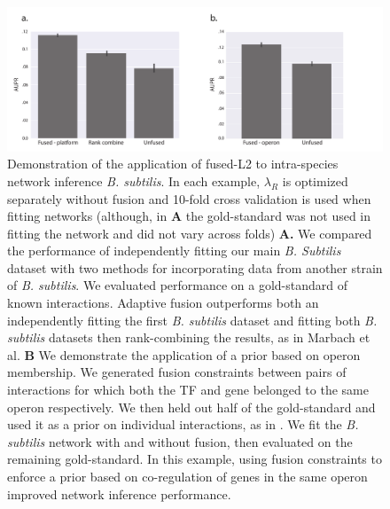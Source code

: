 \documentclass[11pt]{article}
\begin{document}
\begin{figure}
\begin{center}
  \includegraphics[scale=0.30]{fig6.pdf}
  \caption{\label{fusedl2-real} Demonstration of the application of fused-L2 to intra-species network inference \textit{B. subtilis}. In each example, $\lambda_R$ is optimized separately without fusion and 10-fold cross validation is used when fitting networks (although, in \textbf{A} the gold-standard was not used in fitting the network and did not vary across folds) \textbf{A.} We compared the performance of independently fitting our main \textit{B. Subtilis} dataset with two methods for incorporating data from another strain of \textit{B. subtilis}. We evaluated performance on a gold-standard of known interactions. Adaptive fusion outperforms both an independently fitting the first \textit{B. subtilis} dataset and fitting both \textit{B. subtilis} datasets then rank-combining the results, as in Marbach et al. \textbf{B} We demonstrate the application of a prior based on operon membership. We generated fusion constraints between pairs of interactions for which both the TF and gene belonged to the same operon respectively. We then held out half of the gold-standard and used it as a prior on individual interactions, as in \cite{greenfield_robust_2013}. We fit the \textit{B. subtilis} network with and without fusion, then evaluated on the remaining gold-standard. In this example, using fusion constraints to enforce a prior based on co-regulation of genes in the same operon improved network inference performance.}
\end{center}
\end{figure}
\end{document}
